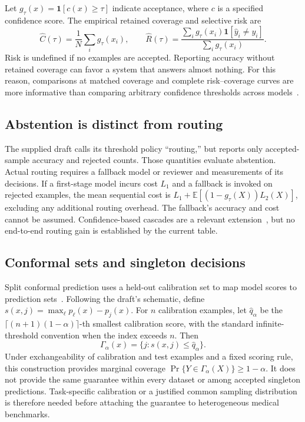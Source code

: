 Let $g_\tau(x)=\mathbf 1[c(x)\geq\tau]$ indicate acceptance, where $c$ is a specified confidence score. The empirical retained coverage and selective risk are
\begin{equation}
 \widehat C(\tau)=\frac{1}{N}\sum_i g_\tau(x_i),\qquad
 \widehat R(\tau)=\frac{\sum_i g_\tau(x_i)\mathbf 1[\hat y_i\ne y_i]}{\sum_i g_\tau(x_i)}.
\label{eq:risk}
\end{equation}
Risk is undefined if no examples are accepted. Reporting accuracy without retained coverage can favor a system that answers almost nothing. For this reason, comparisons at matched coverage and complete risk--coverage curves are more informative than comparing arbitrary confidence thresholds across models~\cite{selective,reliablevqa}.

\subsection{Abstention is distinct from routing}

The supplied draft calls its threshold policy ``routing,'' but reports only accepted-sample accuracy and rejected counts. Those quantities evaluate abstention. Actual routing requires a fallback model or reviewer and measurements of its decisions. If a first-stage model incurs cost $L_1$ and a fallback is invoked on rejected examples, the mean sequential cost is $L_1+\mathbb E[(1-g_\tau(X))L_2(X)]$, excluding any additional routing overhead. The fallback's accuracy and cost cannot be assumed. Confidence-based cascades are a relevant extension~\cite{jevjudge}, but no end-to-end routing gain is established by the current table.

\subsection{Conformal sets and singleton decisions}

Split conformal prediction uses a held-out calibration set to map model scores to prediction sets~\cite{conformal}. Following the draft's schematic, define $s(x,j)=\max_\ell p_\ell(x)-p_j(x)$. For $n$ calibration examples, let $\hat q_\alpha$ be the $\lceil(n+1)(1-\alpha)\rceil$-th smallest calibration score, with the standard infinite-threshold convention when the index exceeds $n$. Then
\begin{equation}
 \Gamma_\alpha(x)=\{j:s(x,j)\leq\hat q_\alpha\}.
\end{equation}
Under exchangeability of calibration and test examples and a fixed scoring rule, this construction provides marginal coverage $\Pr\{Y\in\Gamma_\alpha(X)\}\geq1-\alpha$. It does not provide the same guarantee within every dataset or among accepted singleton predictions. Task-specific calibration or a justified common sampling distribution is therefore needed before attaching the guarantee to heterogeneous medical benchmarks.

